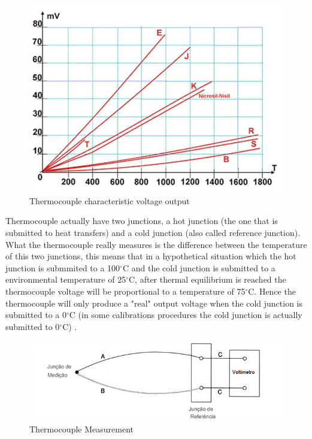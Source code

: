 	\begin{figure}[htbp]
		\centering
			\includegraphics[width=.8\textwidth]{figuras/fig-thermocouple-output.jpg}
		\caption{Thermocouple characteristic voltage output \cite{termo-curves}}
		\label{fig:thermocoupleVoltage}
	\end{figure}
		
	Thermocouple actually have two junctions, a hot junction (the one that is submitted to heat transfers) and a cold junction (also called reference junction). What the thermocouple really measures is the difference between the temperature of this two junctions, this means that in a hypothetical situation which the hot junction is submmited to a 100$^{\circ}$C and the cold junction is submitted to a environmental temperature of 25$^{\circ}$C, after thermal equilibrium is reached the thermocouple voltage will be proportional to a temperature of 75$^{\circ}$C. Hence the thermocouple will only produce a "real" output voltage when the cold junction is submitted to a 0$^{\circ}$C (in some calibrations procedures the cold junction is actually submitted to 0$^{\circ}$C) \cite{kinzie1973thermocouple}.
		
	\begin{figure}[htbp]
		\centering
			\includegraphics[width=.8\textwidth]{figuras/fig-thermocouple-measurement.jpg}
		\caption{Thermocouple Measurement \cite{termo-med}}
		\label{fig:thermocoupleMeasurement}
	\end{figure}
		
